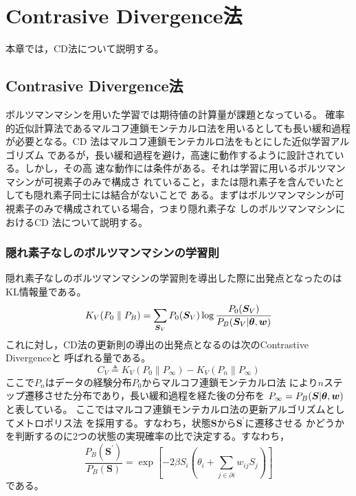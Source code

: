 \chapter{Contrasive Divergence法}
本章では，CD法について説明する。
\section{Contrasive Divergence法}
ボルツマンマシンを用いた学習では期待値の計算量が課題となっている。
確率的近似計算法であるマルコフ連鎖モンテカルロ法を用いるとしても長い緩和過程
が必要となる。CD 法はマルコフ連鎖モンテカルロ法をもとにした近似学習アルゴリズム
であるが，長い緩和過程を避け，高速に動作するように設計されている。しかし，その高
速な動作には条件がある。それは学習に用いるボルツマンマシンが可視素子のみで構成さ
れていること，または隠れ素子を含んでいたとしても隠れ素子同士には結合がないことで
ある。まずはボルツマンマシンが可視素子のみで構成されている場合，つまり隠れ素子な
しのボルツマンマシンにおけるCD 法について説明する。
\subsection{隠れ素子なしのボルツマンマシンの学習則}
隠れ素子なしのボルツマンマシンの学習則を導出した際に出発点となったのは
KL情報量である。
\begin{equation}
K_{V}(P_{0}\parallel P_{B})=\sum_{\bm{S}_{V}}
P_{0}(\bm{S}_{V})\log\frac{P_{0}(\bm{S}_{V})}{P_{B}(\bm{S}_{V}|\boldsymbol{\theta},\bm{w})}
\label{eq:3.1}
\end{equation}
これに対し，CD法の更新則の導出の出発点となるのは次のContrastive Divergenceと
呼ばれる量である。
\begin{equation}
C_{V}\triangleq K_{V}(P_{0}\parallel P_{\infty})
-K_{V}(P_{n}\parallel P_{\infty})\label{eq:3.2}
\end{equation}
ここで$P_{n}$はデータの経験分布$P_{0}$からマルコフ連鎖モンテカルロ法
により$n$ステップ遷移させた分布であり，長い緩和過程を経た後の分布を
$P_{\infty}=P_{B}(\bm{S}|\boldsymbol{\theta},\bm{w})$と表している。
ここではマルコフ連鎖モンテカルロ法の更新アルゴリズムとしてメトロポリス法
を採用する。すなわち，状態$\bm{S}$から$\bm{S}^{\prime}$に遷移させる
かどうかを判断するのに$2$つの状態の実現確率の比で決定する。すなわち，
\begin{equation}
\frac{P_{B}(\bm{S}^{\prime})}{P_{B}(\bm{S})}
=\exp\left[-2\beta S_{i}\left(\theta_{i}+\sum_{j\in\partial i}
w_{ij}S_{j}\right)\right]\label{eq:3.3}
\end{equation}
である。

